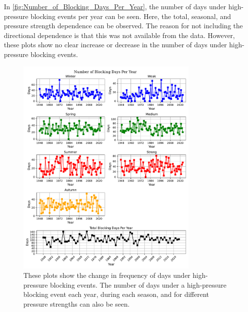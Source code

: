 In \autoref{fig:Number_of_Blocking_Days_Per_Year}, the number of days under high-pressure blocking events per year can be seen. Here, the total, seasonal, and pressure strength dependence can be observed. The reason for not including the directional dependence is that this was not available from the data. However, these plots show no clear increase or decrease in the number of days under high-pressure blocking events.


\begin{figure}[H]
    \centering
    \includegraphics[width=0.8\textwidth]{Figures/blocking_days_per_year_all.pdf}
    \caption{These plots show the change in frequency of days under high-pressure blocking events. The number of days under a high-pressure blocking event each year, during each season, and for different pressure strengths can also be seen.}
    \label{fig:Number_of_Blocking_Days_Per_Year}
\end{figure}






